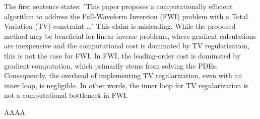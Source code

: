 \begin{point}
	The first sentence states: "This paper proposes a computationally efficient algorithm to address the Full-Waveform Inversion (FWI) problem with a Total Variation (TV) constraint …"
	This claim is misleading. While the proposed method may be beneficial for linear inverse problems, where gradient calculations are inexpensive and the computational cost is dominated by TV regularization, this is not the case for FWI. In FWI, the leading-order cost is dominated by gradient computation, which primarily stems from solving the PDEs. Consequently, the overhead of implementing TV regularization, even with an inner loop, is negligible. In other words, the inner loop for TV regularization is not a computational bottleneck in FWI.
\end{point}

\begin{reply}
AAAA

\end{reply}
